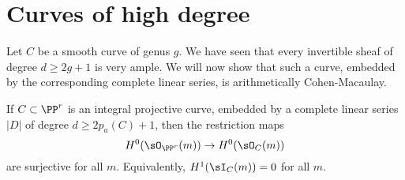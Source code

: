 \section{Curves of high degree}\label{high degree ACM}
Let $C$ be a smooth curve of  genus $g$. We have seen that every invertible sheaf of degree $d \geq 2g+1$ is very ample. We will now show that
such a curve,  embedded by the corresponding complete linear series, is arithmetically Cohen-Macaulay.

\begin{theorem}\label{high degree ACM}
If $C\subset \PP^r$ is an integral projective curve, embedded by a complete linear series $|D|$ of degree $d\geq 2p_a(C)+1$, then
the restriction maps 
$$
H^0(\sO_{\PP^{r}}(m)) \to H^0(\sO_C(m))
$$
 are surjective for all $m$. Equivalently, $H^1(\sI_C(m)) = 0$ for all $m$.
\end{theorem}

